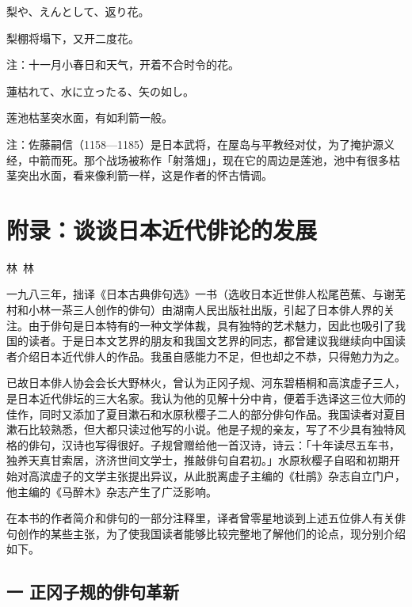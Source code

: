 \begin{haiku}
    {\FH 梨や、えんとして、返り花。}

    {\FK 梨棚将塌下，又开二度花。}

    {\FT 注：十一月小春日和天气，开着不合时令的花。}
\end{haiku}

\begin{haiku}
    {\FH 蓮枯れて、水に立ったる、矢の如し。}

    {\FK 莲池枯茎突水面，有如利箭一般。}

    {\FT 注：佐藤嗣信（1158—1185）是日本武将，在屋岛与平教经对仗，为了掩护源义经，中箭而死。那个战场被称作「射落畑」，现在它的周边是莲池，池中有很多枯茎突出水面，看来像利箭一样，这是作者的怀古情调。}
\end{haiku}

\chapter{\FS 附录：谈谈日本近代俳论的发展}

{\hfill \FS 林~林}

{\FS
    一九八三年，拙译《日本古典俳句选》一书（选收日本近世俳人松尾芭蕉、与谢芜村和小林一茶三人创作的俳句）由湖南人民出版社出版，引起了日本俳人界的关注。由于俳句是日本特有的一种文学体裁，具有独特的艺术魅力，因此也吸引了我国的读者。于是日本文艺界的朋友和我国文艺界的同志，都曾建议我继续向中国读者介绍日本近代俳人的作品。我虽自感能力不足，但也却之不恭，只得勉力为之。

    已故日本俳人协会会长大野林火，曾认为正冈子规、河东碧梧桐和高滨虚子三人，是日本近代俳坛的三大名家。我认为他的见解十分中肯，便着手选译这三位大师的佳作，同时又添加了夏目漱石和水原秋樱子二人的部分俳句作品。我国读者对夏目漱石比较熟悉，但大都只读过他写的小说。他是子规的亲友，写了不少具有独特风格的俳句，汉诗也写得很好。子规曾赠给他一首汉诗，诗云：「十年读尽五车书，独养天真甘索居，济济世间文学士，推敲俳句自君初。」水原秋樱子自昭和初期开始对高滨虚子的文学主张提出异议，从此脱离虚子主编的《杜鹃》杂志自立门户，他主编的《马醉木》杂志产生了广泛影响。

    在本书的作者简介和俳句的一部分注释里，译者曾零星地谈到上述五位俳人有关俳句创作的某些主张，为了使我国读者能够比较完整地了解他们的论点，现分别介绍如下。
}

\section*{\FS 一 正冈子规的俳句革新}

